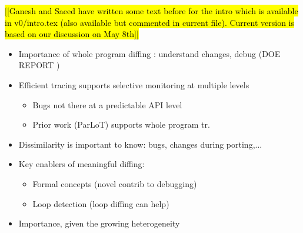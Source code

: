 \hl{[[Ganesh and Saeed have written some text before for the intro which is available in v0/intro.tex (also available but commented in current file). Current version is based on our discussion on May 8th]]}

\begin{itemize}
	\item Importance of whole program diffing : understand changes, debug (DOE REPORT \cite{hpcdoe})
	\item Efficient tracing supports selective monitoring at multiple levels
	\begin{itemize}
		\item Bugs not there at a predictable API level
		\item Prior work (ParLoT) supports whole program tr.
	\end{itemize}
	\item Dissimilarity is important to know: bugs, changes during porting,...
	\item Key enablers of meaningful diffing:
	\begin{itemize}
		\item Formal concepts (novel contrib to debugging)
		\item Loop detection (loop diffing can help)
	\end{itemize}
	\item Importance, given the growing heterogeneity
\end{itemize}


%
%
%
%
%
%


